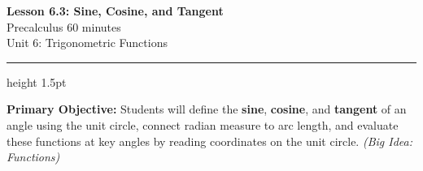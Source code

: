 \documentclass[10pt]{article}
\newcommand{\CourseName}{Precalculus}
\newcommand{\MeetingLength}{60 minutes}
\newcommand{\UnitNumberName}{Unit 6: Trigonometric Functions \quad}
\begin{document}
\begin{center}
  {\LARGE\bfseries\color{navy} Lesson 6.3: Sine, Cosine, and Tangent}\\[4pt]
  {\large \CourseName{} \textbullet{} \MeetingLength}\\[2pt]
  {\large \UnitNumberName}
\end{center}
\vspace{4pt}
\hrule height 1.5pt
\vspace{8pt}

\begin{tcolorbox}[colback=sky, colframe=navy, boxrule=0.9pt, arc=2mm,
    left=2mm, right=2mm, top=1.5mm, bottom=1.5mm]
  \textbf{Primary Objective:} Students will define the \textbf{sine}, \textbf{cosine}, and
  \textbf{tangent} of an angle using the unit circle, connect radian measure to arc length,
  and evaluate these functions at key angles by reading coordinates on the unit circle.
  \textit{(Big Idea: Functions)}
\end{tcolorbox}

\vspace{6pt}
\end{document}
